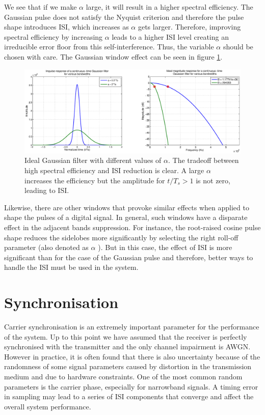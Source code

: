 \documentclass[12pt,a4paper,openright]{report}
\begin{document}
We see that if we make $\alpha$ large, it will result in a higher spectral efficiency. The Gaussian pulse does not satisfy the Nyquist criterion and therefore the pulse shape introduces ISI, which increases as $\alpha$ gets larger. Therefore, improving spectral efficiency by increasing $\alpha$ leads to a higher ISI level creating an irreducible error floor from this self-interference. Thus, the variable $\alpha$ should be chosen with care. The Gaussian window effect can be seen in figure \ref{fig:gaussianalpha}.

 \begin{figure}[H]
  \centering
    \includegraphics[width=1\textwidth]{gausswinalpha.eps}
    \caption[Ideal Gaussian filter with different values of $\alpha$]{Ideal Gaussian filter with different values of $\alpha$. The tradeoff between high spectral efficiency and ISI reduction is clear. A large $\alpha$ increases the efficiency but the amplitude for $t/T_s > 1$ is not zero, leading to ISI.}
    \label{fig:gaussianalpha}
\end{figure}  

Likewise, there are other windows that provoke similar effects when applied to shape the pulses of a digital signal. In general, such windows have a disparate effect in the adjacent bands suppression. For instance, the root-raised cosine pulse shape reduces the sidelobes more significantly by selecting the right roll-off parameter (also denoted as $\alpha$ ). But in this case, the effect of ISI is more significant than for the case of the Gaussian pulse and therefore, better ways to handle the ISI must be used in the system. 


\section{Synchronisation}
\label{sec:ts}

Carrier synchronisation is an extremely important parameter for the performance of the system. Up to this point we have assumed that the receiver is perfectly synchronised with the transmitter and the only channel impairment is AWGN. However in practice, it is often found that there is also uncertainty because of the randomness of some signal parameters caused by distortion in the transmission medium and due to hardware constraints. One of the most common random parameters is the carrier phase, especially for narrowband signals. A timing error in sampling may lead to a series of ISI components that converge and affect the overall system performance. 
\end{document}
